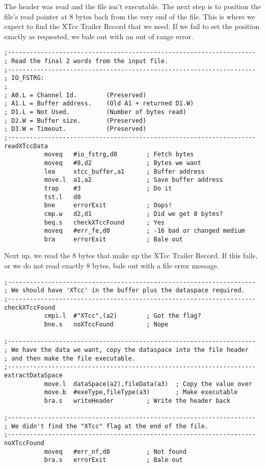 The header was read and the file isn't executable. The next step is to position the file's read pointer at 8 bytes back from the very end of the file. This is where we expect to find the XTcc Trailer Record that we need. If we fail to set the position exactly as requested, we bale out with an out of range error.


\begin{lstlisting}[firstnumber=last,caption={XTcc - Read the XTcc Trailer Record}]
;--------------------------------------------------------------------
; Read the final 2 words from the input file.
;--------------------------------------------------------------------
; IO_FSTRG:
;
; A0.L = Channel Id.        (Preserved)
; A1.L = Buffer address.    (Old A1 + returned D1.W)
; D1.L = Not Used.          (Number of bytes read)
; D2.W = Buffer size.       (Preserved)
; D3.W = Timeout.           (Preserved)
;--------------------------------------------------------------------
readXTccData
           moveq   #io_fstrg,d0        ; Fetch bytes
           moveq   #8,d2               ; Bytes we want
           lea     xtcc_buffer,a1      ; Buffer address
           move.l  a1,a2               ; Save buffer address
           trap    #3                  ; Do it
           tst.l   d0
           bne     errorExit           ; Oops!
           cmp.w   d2,d1               ; Did we get 8 bytes?
           beq.s   checkXTccFound      ; Yes
           moveq   #err_fe,d0          ; -16 bad or changed medium
           bra     errorExit           ; Bale out
\end{lstlisting}

Next up, we read the 8 bytes that make up the XTcc Trailer Record. If this fails, or we do not read exactly 8 bytes, bale out with a file error message.


\begin{lstlisting}[firstnumber=last,caption={XTcc - Setting the Header Data}]
;--------------------------------------------------------------------
; We should have 'XTcc' in the buffer plus the dataspace required.
;--------------------------------------------------------------------
checkXTccFound
           cmpi.l  #"XTcc",(a2)        ; Got the flag?
           bne.s   noXTccFound         ; Nope

;--------------------------------------------------------------------
; We have the data we want, copy the dataspace into the file header
; and then make the file executable.
;--------------------------------------------------------------------
extractDataSpace
           move.l  dataSpace(a2),fileData(a3)  ; Copy the value over
           move.b  #exeType,fileType(a3)       ; Make executable
           bra.s   writeHeader         ; Write the header back

;--------------------------------------------------------------------
; We didn't find the "XTcc" flag at the end of the file.
;--------------------------------------------------------------------
noXTccFound
           moveq   #err_nf,d0          ; Not found
           bra.s   errorExit           ; Bale out
\end{lstlisting}

